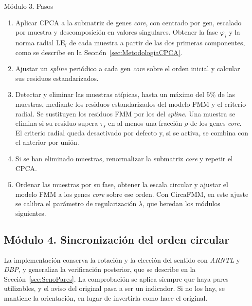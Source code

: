 \documentclass[12pt, a4paper]{report}
\newcommand{\nuevo}[1]{\textcolor{cnuevo}{#1}}
\newenvironment{pasos}{\begin{enumerate}[nosep,leftmargin=1.5em,label=\arabic*.]}{\end{enumerate}}
\begin{document}
\begin{panel}{Módulo 3. Pasos}
\begin{pasos}
\item Aplicar CPCA a la submatriz de genes \textit{core}, con centrado por gen, escalado por muestra y descomposición en valores singulares. Obtener la fase \(\varphi_i\) y la norma radial \(\mathrm{LE}_i\) de cada muestra a partir de las dos primeras componentes, como se describe en la Sección~\ref{sec:MetodologiaCPCA}.
\item \nuevo{Ajustar un \textit{spline} periódico a cada gen \textit{core} sobre el orden inicial y calcular sus residuos estandarizados.}
\item Detectar y eliminar las muestras atípicas, hasta un máximo del \(5\%\) de las muestras, mediante los residuos estandarizados del modelo FMM y el criterio radial. \nuevo{Se sustituyen los residuos FMM por los del \textit{spline}. Una muestra se elimina si su residuo supera \(\tau_s\) en al menos una fracción \(\rho\) de los genes \textit{core}. El criterio radial queda desactivado por defecto y, si se activa, se combina con el anterior por unión.}
\item Si se han eliminado muestras, renormalizar la submatriz \textit{core} y repetir el CPCA.
\item Ordenar las muestras por su fase, obtener la escala circular y ajustar el modelo FMM a los genes \textit{core} sobre ese orden. \nuevo{Con CircaFMM, en este ajuste se calibra el parámetro de regularización \(\lambda\), que heredan los módulos siguientes.}
\end{pasos}
\end{panel}

\subsection{Módulo 4. Sincronización del orden circular}

La implementación conserva la rotación y la elección del sentido con \textit{ARNTL} y \textit{DBP}, y generaliza la verificación posterior, que se describe en la Sección~\ref{sec:SenoPares}. La comprobación se aplica siempre que haya pares utilizables, y el aviso del original pasa a ser un indicador. Si no los hay, se mantiene la orientación, en lugar de invertirla como hace el original.
\end{document}
